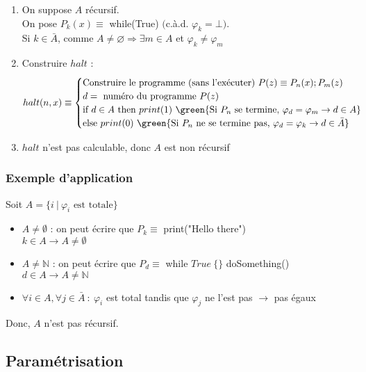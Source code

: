 \begin{enumerate}
\item On suppose $A$ récursif.\\
	On pose $P_k(x) \equiv$ while(True) $($c.à.d. $\varphi_k = \bot)$.\\
	Si $k \in \bar{A}$, comme $A \neq \varnothing \Rightarrow \exists m \in A$ et $\varphi_k \neq \varphi_m$
\item Construire $halt$ :
	\begin{equation*}
		 halt(n,x) \equiv
		 \begin{cases}
		 \text{Construire le programme (sans l'exécuter) } P(z) \equiv P_n(x); P_m(z)\\
		 d = \text{ numéro du programme }P(z)\\
		 \text{if } d \in A \text{ then } print(1) \ \green{\text{Si }P_n \text{ se termine, } \varphi_d = \varphi_m \rightarrow d \in A}\\
		 \text{else } print(0) \ \green{\text{Si }P_n \text{ ne se termine pas, } \varphi_d = \varphi_k \rightarrow d \in \bar{A}}\\
		 \end{cases}
	\end{equation*}
\item $halt$ n'est pas calculable, donc $A$ est non récursif
\end{enumerate}

\subsubsection{Exemple d'application}

Soit $A = \{i \ |\ \varphi_i \text{ est totale}\}$
\begin{itemize}
\item $A \neq \emptyset$ : on peut écrire que $P_k \equiv$ print("Hello there")\\
	$k \in A \rightarrow A \neq \emptyset$
\item $A \neq \mathbb{N}$ : on peut écrire que $P_d \equiv$ while $True \ \{\}$ doSomething()
	$d \in A \rightarrow A \neq \mathbb{N}$
\item $\forall i \in A, \forall j \in \bar{A}\ :\ \varphi_i$ est total tandis que $\varphi_j$ ne l'est pas $\rightarrow$ pas égaux
\end{itemize}
Donc, $A$ n'est pas récursif.

\subsection{Paramétrisation}

